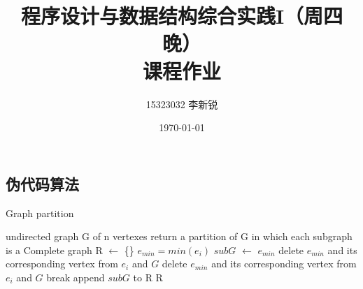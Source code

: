 \documentclass[UTF8]{ctexart}
\title{程序设计与数据结构综合实践I（周四晚）
    \\课程作业}
\author{15323032 李新锐}
\date{\today}
\begin{document}
            \newpage
            \subsection{伪代码算法}
            \begin{algorithm}
                \caption{Graph partition}
                \begin{algorithmic}
                \REQUIRE  undirected graph G of n vertexes
                \ENSURE return a partition of G in which each subgraph is a Complete graph
                \ENDFOR
                \STATE R $\gets$ \{\}
                	\STATE $e_{min} = min(e_i)$
                	\STATE $subG$ $\gets$ {$e_{min}$}
                	\STATE delete $e_{min}$ and its corresponding vertex from $e_i$ and $G$
                			\STATE delete $e_{min}$ and its corresponding vertex from $e_i$ and $G$
                		\ELSE
                			\STATE break
                		\ENDIF
                	\ENDFOR
                	\STATE append $subG$ to R
                \ENDWHILE
                \RETURN R 
                \end{algorithmic}
              \end{algorithm}
            \newpage
    
\end{document}
